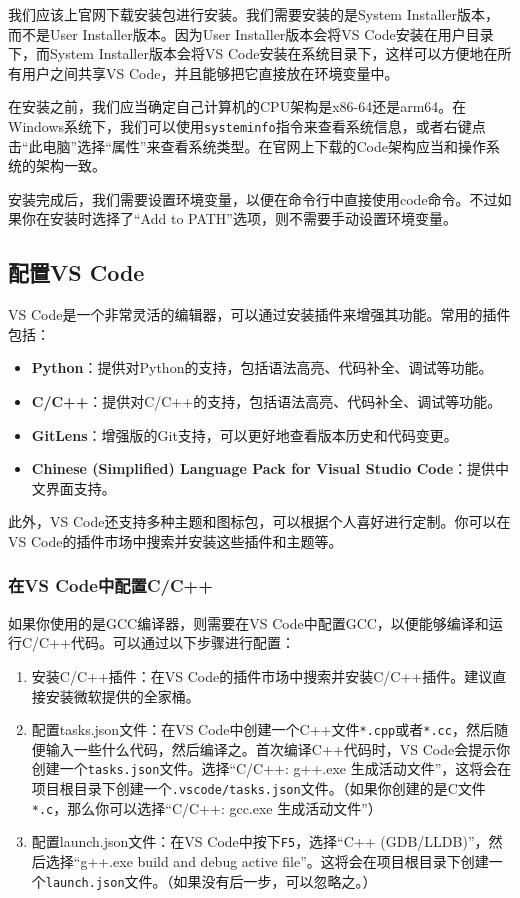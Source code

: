 \documentclass[../main.tex]{subfiles}
\begin{document}
我们应该上官网下载安装包进行安装。我们需要安装的是System Installer版本，而不是User Installer版本。因为User Installer版本会将VS Code安装在用户目录下，而System Installer版本会将VS Code安装在系统目录下，这样可以方便地在所有用户之间共享VS Code，并且能够把它直接放在环境变量中。

在安装之前，我们应当确定自己计算机的CPU架构是x86-64还是arm64。在Windows系统下，我们可以使用\texttt{systeminfo}指令来查看系统信息，或者右键点击“此电脑”选择“属性”来查看系统类型。在官网上下载的Code架构应当和操作系统的架构一致。

安装完成后，我们需要设置环境变量，以便在命令行中直接使用code命令。不过如果你在安装时选择了“Add to PATH”选项，则不需要手动设置环境变量。

\subsection{配置VS Code}

VS Code是一个非常灵活的编辑器，可以通过安装插件来增强其功能。常用的插件包括：

\begin{itemize}
  \item \textbf{Python}：提供对Python的支持，包括语法高亮、代码补全、调试等功能。
  \item \textbf{C/C++}：提供对C/C++的支持，包括语法高亮、代码补全、调试等功能。
  \item \textbf{GitLens}：增强版的Git支持，可以更好地查看版本历史和代码变更。
  \item \textbf{Chinese (Simplified) Language Pack for Visual Studio Code}：提供中文界面支持。
\end{itemize}

此外，VS Code还支持多种主题和图标包，可以根据个人喜好进行定制。你可以在VS Code的插件市场中搜索并安装这些插件和主题等。

\subsubsection{在VS Code中配置C/C++}\label{sec:configure-cpp}

如果你使用的是GCC编译器，则需要在VS Code中配置GCC，以便能够编译和运行C/C++代码。可以通过以下步骤进行配置：

\begin{enumerate}
  \item 安装C/C++插件：在VS Code的插件市场中搜索并安装C/C++插件。建议直接安装微软提供的全家桶。
  \item 配置tasks.json文件：在VS Code中创建一个C++文件\texttt{*.cpp}或者\texttt{*.cc}，然后随便输入一些什么代码，然后编译之。首次编译C++代码时，VS Code会提示你创建一个\texttt{tasks.json}文件。选择“C/C++: g++.exe 生成活动文件”，这将会在项目根目录下创建一个\texttt{.vscode/tasks.json}文件。（如果你创建的是C文件\texttt{*.c}，那么你可以选择“C/C++: gcc.exe 生成活动文件”）
  \item 配置launch.json文件：在VS Code中按下\texttt{F5}，选择“C++ (GDB/LLDB)”，然后选择“g++.exe build and debug active file”。这将会在项目根目录下创建一个\texttt{launch.json}文件。（如果没有后一步，可以忽略之。）
\end{enumerate}
\end{document}
